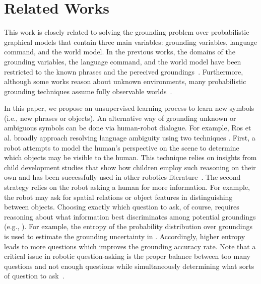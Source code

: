 \section{Related Works}
\label{sec:related}
This work is closely related to solving the grounding problem over probabilistic graphical models that contain three main variables: grounding variables, language command, and the world model.
In the previous works, the domains of the grounding variables, the language command, and the world model have been restricted to the known phrases and the perecived groundings~\cite{g3,dcg}.
Furthermore, although some works reason about unknown environments, many probabilistic grounding techniques assume fully observable worlds~\cite{citeLangNoisySensor,outside1}.

In this paper, we propose an unsupervised learning process to learn new symbols (i.e., new phrases or objects). An alternative way of grounding unknown or ambiguous symbols can be done via human-robot dialogue. For example, Ros et al. broadly approach resolving language ambiguity using two techniques \cite{whichOne}. First, a robot attempts to model the human's perspective on the scene to determine which objects may be visible to the human.
This technique relies on insights from child development studies that show how children employ such reasoning on their own and has been successfully used in other robotics literature~\cite{kids1,kids2,perspective1,perspective2}.
The second strategy relies on the robot asking a human for more information.
For example, the robot may ask for spatial relations or object features in distinguishing between objects.
Choosing exactly which question to ask, of course, requires reasoning about what information best discriminates among potential groundings (e.g., \cite{clarifyingCommands}). %
For example, the entropy of the probability distribution over groundings is used to estimate the grounding uncertainty in \cite{clarifyingCommands}. Accordingly, higher entropy leads to more questions which improves the grounding accuracy rate.
Note that a critical issue in robotic question-asking is the proper balance between too many questions and not enough questions while simultaneously determining what sorts of question to ask~\cite{interaction1,interaction2}.

